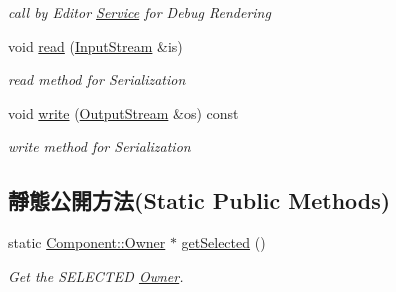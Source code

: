 \begin{DoxyCompactItemize}
\begin{DoxyCompactList}\small\item\em call by Editor \hyperlink{class_i_dream_sky_1_1_service}{Service} for Debug Rendering \end{DoxyCompactList}\item 
void \hyperlink{class_i_dream_sky_1_1_component_1_1_owner_ad3a6cf325d63ebe6e67440f7c8688420}{read} (\hyperlink{class_i_dream_sky_1_1_input_stream}{Input\+Stream} \&is)
\begin{DoxyCompactList}\small\item\em read method for Serialization \end{DoxyCompactList}\item 
void \hyperlink{class_i_dream_sky_1_1_component_1_1_owner_aa0aa90562a79de82adecd5b0451d3bd5}{write} (\hyperlink{class_i_dream_sky_1_1_output_stream}{Output\+Stream} \&os) const 
\begin{DoxyCompactList}\small\item\em write method for Serialization \end{DoxyCompactList}\end{DoxyCompactItemize}
\subsection*{靜態公開方法(Static Public Methods)}
\begin{DoxyCompactItemize}
\item 
static \hyperlink{class_i_dream_sky_1_1_component_1_1_owner}{Component\+::\+Owner} $\ast$ \hyperlink{class_i_dream_sky_1_1_component_1_1_owner_a0235cf8f0a39af071d264c93fe83f959}{get\+Selected} ()\hypertarget{class_i_dream_sky_1_1_component_1_1_owner_a0235cf8f0a39af071d264c93fe83f959}{}\label{class_i_dream_sky_1_1_component_1_1_owner_a0235cf8f0a39af071d264c93fe83f959}

\begin{DoxyCompactList}\small\item\em Get the S\+E\+L\+E\+C\+T\+ED \hyperlink{class_i_dream_sky_1_1_component_1_1_owner}{Owner}. \end{DoxyCompactList}\end{DoxyCompactItemize}
